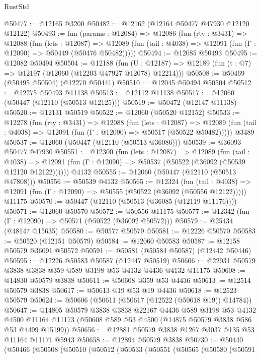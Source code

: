 \begin{lexlean}{RustStd}
\begin{coremodule}
@50477 := @12165 @3200
@50482 := @12162 (@12164 @50477 @47930 @12120 @12122)
@50493 := fun (params : @12084) =>
  @12086
    (fun (rty : @3431) =>
    @12088
      (fun (lets : @12087) =>
      @12089 (fun (tail : @4038) => @12091 (fun (Γ : @12090) => @50449 (@50476 @50482)))))
@50494 := @12085 @50493
@50495 := @12082 @50494
@50504 := @12188
    (fun (U : @12187) => @12189 (fun (t : @7) => @12197 (@12060 (@12203 @47927 @12078) @12214)))
@50508 := @50469 (@50495 @50504) (@12270 @50441)
@50510 := @12045 @50494 @50504
@50512 := @12275 @50493 @11138
@50513 := @12112 @11138
@50517 := @12060 (@50447 (@12110 (@50513 @12125)))
@50519 := @50472 (@12147 @11138)
@50520 := @12131 @50519
@50522 := @12060 (@50520 @12152)
@50533 := @12278
    (fun (rty : @3431) =>
    @12088
      (fun (lets : @12087) =>
      @12089 (fun (tail : @4038) => @12091 (fun (Γ : @12090) => @50517 (@50522 @50482)))))
    @3489
@50537 := @12060 (@50447 (@12110 (@50513 @36086)))
@50539 := @36093 @50477 @47930
@50551 := @12300
    (fun (lets : @12087) =>
    @12089
      (fun (tail : @4038) =>
      @12091 (fun (Γ : @12090) => @50537 (@50522 (@36092 (@50539 @12120 @12122))))))
    @4132
@50555 := @12060 (@50447 (@12110 (@50513 @47808)))
@50556 := @50539 @4132
@50565 := @12324
    (fun (tail : @4038) => @12091 (fun (Γ : @12090) => @50555 (@50522 (@36092 (@50556 @12122)))))
    @11175
@50570 := @50447 (@12110 (@50513 (@36085 (@12119 @11176))))
@50571 := @12060 @50570
@50572 := @50556 @11175
@50577 := @12342 (fun (Γ : @12090) => @50571 (@50522 (@36092 @50572)))
@50579 := @25434 (@48147 @15635)
@50580 := @50577 @50579
@50581 := @12226 @50570
@50583 := @50520 (@12151 @50579)
@50584 := @12060 @50583
@50587 := @12158 @50579 @36091 @50572
@50591 := @50581 (@50584 @50587) (@12442 @50446)
@50595 := @12226 @50583 @50587 (@12447 @50519)
@50606 := @22031 @50579 @3838 @3838 @359 @589 @3198 @53 @4132 @4436 @4132 @11175
@50608 := @14830 @50579 @3838
@50611 := @50608 @359 @53 @4436
@50613 := @12514 @50579 @3838
@50617 := @50613 @19 @53 @19 @4436
@50618 := @12523 @50579
@50624 := @50606 (@50611 (@50617 (@12522 (@50618 @19)) @14784))
@50647 := @14805
    @50579
    @3838
    @3838
    @22167
    @4436
    @589
    @3198
    @53
    @4132
    @4500
    @11164
    @11173
    (@50608 @589 @53 @4500 (@14875 @50579 @3838 @586 @53 @4499 @15199))
@50656 := @12881 @50579 @3838 @1267 @3037 @135 @53 @11164 @11171 @5943
@50658 := @12894 @50579 @3838
@50730 := @50440
    (@50466
      (@50508
        (@50510
          (@50512
            (@50533
              (@50551
                (@50565
                  (@50580
                    (@50591

\end{coremodule}
\end{lexlean}

